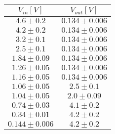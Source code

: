 \begin{tabular}{cc}
\hline
	$V_{in}[V]$ & $V_{out}[V]$\\ 
\hline
	$4.6\pm0.2$ & $0.134\pm0.006$ \\
	$4.2\pm0.2$ & $0.134\pm0.006$ \\
	$3.2\pm0.1$ & $0.134\pm0.006$ \\
	$2.5\pm0.1$ & $0.134\pm0.006$ \\
	$1.84\pm0.09$ & $0.134\pm0.006$ \\
	$1.26\pm0.05$ & $0.134\pm0.006$ \\
	$1.16\pm0.05$ & $0.134\pm0.006$ \\
	$1.06\pm0.05$ & $2.5\pm0.1$ \\
	$1.04\pm0.05$ & $2.0\pm0.09$ \\
	$0.74\pm0.03$ & $4.1\pm0.2$ \\
	$0.34\pm0.01$ & $4.2\pm0.2$ \\
	$0.144\pm0.006$ & $4.2\pm0.2$ \\
\hline
\end{tabular}
